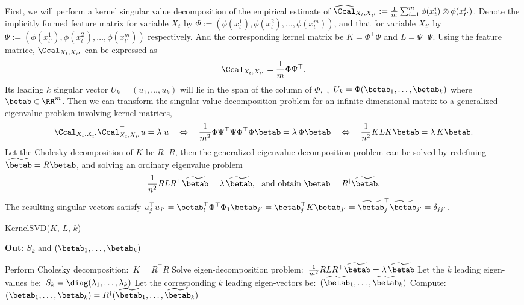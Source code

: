 \documentclass[11pt]{article}
\begin{document}
First, we will perform a kernel singular value decomposition of the empirical estimate of $\widehat \Ccal_{X_t,X_{t'}}:= \frac{1}{m} \sum_{i=1}^m \phi(x_t^i) \otimes \phi(x_{t'}^i)$. Denote the implicitly formed feature matrix for variable $X_t$ by $\Phi := (\phi(x_t^1),  \phi(x_t^2), \ldots, \phi(x_t^m))$, and that for variable $X_{t'}$ by $\Psi := (\phi(x_{t'}^1), \phi(x_{t'}^2), \ldots, \phi(x_{t'}^m))$ respectively. And the corresponding kernel matrix be $K = \Phi^\top \Phi$ and $L = \Psi^\top \Psi$. Using the feature matrice, $\Ccal_{X_t,X_{t'}}$ can be expressed as
$$
	\Ccal_{X_t,X_{t'}} = \frac{1}{m} \Phi \Psi^\top.
$$
Its leading $k$ singular vector $U_k = (u_1,\ldots,u_k)$ will lie in the span of the column of  $\Phi$,~\ie,~$U_k = \Phi (\betab_1,\ldots,\betab_k)$ where $\betab \in \RR^m$. Then we can transform the singular value decomposition problem for an infinite dimensional matrix to a generalized eigenvalue problem involving kernel matrices,
$$
	\Ccal_{X_t,X_{t'}} \Ccal_{X_t,X_{t'}}^\top u = \lambda\;u
	\quad \Leftrightarrow \quad
	\frac{1}{m^2}\Phi \Psi^\top \Psi \Phi^\top \Phi \betab = \lambda\,\Phi \betab
	\quad \Leftrightarrow \quad
	\frac{1}{n^2} K L K \betab = \lambda\,K \betab.
$$
Let the Cholesky decomposition of $K$ be $R^\top R$, then the generalized eigenvalue decomposition problem can be solved by redefining $\widetilde{\betab}=R\betab$, and solving an ordinary eigenvalue problem
\begin{align}
 \frac{1}{n^2} R L R^\top \widetilde{\betab} = \lambda\, \widetilde{\betab},~~\text{and obtain}~\betab = R^{\dagger} \widetilde{\betab}.
\end{align}
The resulting singular vectors satisfy $u_j^\top u_{j'} = \betab_l^\top \Phi^\top \Phi_1 \betab_{j'} =  \betab_{j}^\top K  \betab_{j'} =  \widetilde{\betab}_{j}^\top \widetilde{\betab}_{j'}=\delta_{jj'}$.

\begin{algorithm}[t!]
\caption{KernelSVD($K$, $L$, $k$)}
	\textbf{Out}: $S_k$ and $(\betab_1,\ldots,\betab_k)$\\[-0.4cm]
  \begin{algorithmic}[1]
    \STATE Perform Cholesky decomposition:\ $K=R^\top R$
    \STATE Solve eigen-decomposition problem:\ $\frac{1}{m^2} R L R^\top \widetilde{\betab} = \lambda\,\widetilde{\betab}$
		\STATE Let the $k$ leading eigen-values be:\ $S_k = \diag(\lambda_1,\ldots,\lambda_k)$
		\STATE Let the corresponding $k$ leading eigen-vectors be:\ $(\widetilde{\betab}_1,\ldots,\widetilde{\betab}_k)$
    \STATE Compute:\ $(\betab_1,\ldots,\betab_k) = R^\dagger (\widetilde{\betab}_1,\ldots,\widetilde{\betab}_k)$
  \end{algorithmic}
  \label{alg:svd}
\end{algorithm}
\end{document}
